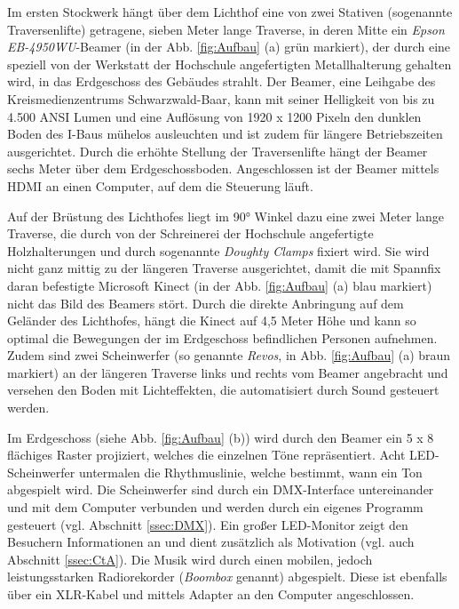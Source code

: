 Im ersten Stockwerk hängt über dem Lichthof eine von zwei Stativen (sogenannte Traversenlifte) getragene, sieben Meter lange Traverse, in deren Mitte ein \emph{Epson EB-4950WU}-Beamer (in der Abb. \ref{fig:Aufbau} (a) grün markiert), der durch eine speziell von der Werkstatt der Hochschule angefertigten Metallhalterung gehalten wird, in das Erdgeschoss des Gebäudes strahlt. Der Beamer, eine Leihgabe des Kreismedienzentrums Schwarzwald-Baar, kann mit seiner Helligkeit von bis zu 4.500 ANSI Lumen und eine Auflösung von 1920 x 1200 Pixeln den dunklen Boden des I-Baus mühelos ausleuchten und ist zudem für längere Betriebszeiten ausgerichtet. Durch die erhöhte Stellung der Traversenlifte hängt der Beamer sechs Meter über dem Erdgeschossboden. Angeschlossen ist der Beamer mittels HDMI an einen Computer, auf dem die Steuerung läuft.

Auf der Brüstung des Lichthofes liegt im 90° Winkel dazu eine zwei Meter lange Traverse, die durch von der Schreinerei der Hochschule angefertigte Holzhalterungen und durch sogenannte \emph{Doughty Clamps} fixiert wird. Sie wird nicht ganz mittig zu der längeren Traverse ausgerichtet, damit die mit Spannfix daran befestigte Microsoft Kinect (in der Abb. \ref{fig:Aufbau} (a) blau markiert) nicht das Bild des Beamers stört. Durch die direkte Anbringung auf dem Geländer des Lichthofes, hängt die Kinect auf 4,5 Meter Höhe und kann so optimal die Bewegungen der im Erdgeschoss befindlichen Personen aufnehmen. Zudem sind zwei Scheinwerfer (so genannte \textit{Revos}, in Abb. \ref{fig:Aufbau} (a) braun markiert) an der längeren Traverse links und rechts vom Beamer angebracht und versehen den Boden mit Lichteffekten, die automatisiert durch Sound gesteuert werden.

Im Erdgeschoss (siehe Abb. \ref{fig:Aufbau} (b)) wird durch den Beamer ein 5 x 8 flächiges Raster projiziert, welches die einzelnen Töne repräsentiert. Acht LED-Scheinwerfer untermalen die Rhythmuslinie, welche bestimmt, wann ein Ton abgespielt wird. Die Scheinwerfer sind durch ein DMX-Interface untereinander und mit dem Computer verbunden und werden durch ein eigenes Programm gesteuert (vgl. Abschnitt \ref{ssec:DMX}). Ein großer LED-Monitor zeigt den Besuchern Informationen an und dient zusätzlich als Motivation (vgl. auch Abschnitt \ref{ssec:CtA}). Die Musik wird durch einen mobilen, jedoch leistungsstarken Radiorekorder (\textit{Boombox} genannt) abgespielt. Diese ist ebenfalls über ein XLR-Kabel und mittels Adapter an den Computer angeschlossen.